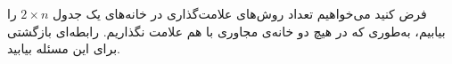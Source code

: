 \EXERCISE
فرض کنید می‌خواهیم تعداد روش‌های علامت‌گذاری در خانه‌های یک جدول
$2 \times n$
را بیابیم، به‌طوری که در هیچ دو خانه‌ی مجاوری با هم علامت نگذاریم. رابطه‌ای بازگشتی برای این مسئله بیابید.